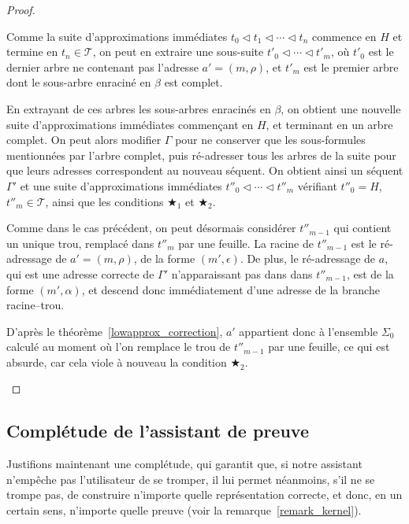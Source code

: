 \documentclass[11pt,a4paper]{article}
\theoremstyle{plain}
\theoremstyle{definition}
\theoremstyle{remark}
\newcommand*{\someadd}{\rho}
\newcommand*{\sequent}{\Gamma}
\newcommand*{\trees}{\ensuremath{\mathcal{T}}}
\newcommand*{\relapprox}{\ensuremath{\triangleleft}}
\newcommand*{\lowapprox}{\ensuremath{\Sigma_0}}
\newcommand*{\exactcond}{\bigstar_1}
\newcommand*{\exactcondbis}{\bigstar_2}
\begin{document}
\begin{proof}
\begin{description}
        Comme la suite d'approximations immédiates $t_0 \relapprox t_1 \relapprox \cdots \relapprox t_n$ commence en $H$ et termine en $t_n \in \trees$, on peut en extraire une sous-suite $t'_0 \relapprox \cdots \relapprox t'_m$, où $t'_0$ est le dernier arbre ne contenant pas l'adresse $a' = (m, \someadd)$, et $t'_m$ est le premier arbre dont le sous-arbre enraciné en $\beta$ est complet.

        En extrayant de ces arbres les sous-arbres enracinés en $\beta$, on obtient une nouvelle suite d'approximations immédiates commençant en $H$, et terminant en un arbre complet. On peut alors modifier $\sequent$ pour ne conserver que les sous-formules mentionnées par l'arbre complet, puis ré-adresser tous les arbres de la suite pour que leurs adresses correspondent au nouveau séquent. On obtient ainsi un séquent $\sequent'$ et une suite d'approximations immédiates $t''_0 \relapprox \cdots \relapprox t''_m$ vérifiant $t''_0 = H$, $t''_m \in \trees$, ainsi que les conditions $\exactcond$ et $\exactcondbis$.

        Comme dans le cas précédent, on peut désormais considérer $t''_{m-1}$ qui contient un unique trou, remplacé dans $t''_m$ par une feuille. La racine de $t''_{m-1}$ est le ré-adressage de $a' = (m, \rho)$, de la forme $(m', \epsilon)$. De plus, le ré-adressage de $a$, qui est une adresse correcte de $\sequent'$ n'apparaissant pas dans dans $t''_{m-1}$, est de la forme $(m', \alpha)$, et descend donc immédiatement d'une adresse de la branche racine--trou.

        D'après le théorème~\ref{lowapprox_correction}, $a'$ appartient donc à l'ensemble $\lowapprox$ calculé au moment où l'on remplace le trou de $t''_{m-1}$ par une feuille, ce qui est absurde, car cela viole à nouveau la condition $\exactcondbis$.
\qedhere
    \end{description}
\end{proof}

\subsection{Complétude de l'assistant de preuve}

Justifions maintenant une complétude, qui garantit que, si notre assistant n'empêche pas l'utilisateur de se tromper, il lui permet néanmoins, s'il ne se trompe pas, de construire n'importe quelle représentation correcte, et donc, en un certain sens, n'importe quelle preuve (voir la remarque~\ref{remark_kernel}).
\end{document}
